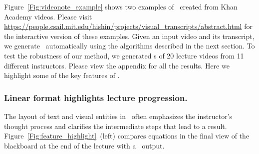 Figure~\ref{Fig:videonote_example} shows two examples of \systemname\ created from Khan Academy videos. Please visit \url{https://people.csail.mit.edu/hishin/projects/visual_transcripts/abstract.html} for the interactive version of these examples. Given an input video and its transcript, we generate \systemname\ automatically using the algorithms described in the next section. To test the robustness of our method, we generated \systemname s of 20 lecture videos from 11 different instructors. Please view the appendix for all the results. Here we highlight some of the key features of \systemname .\\
%

\subsubsection{Linear format highlights lecture progression.} 
The layout of text and visual entities in \systemname\ often emphasizes the instructor's thought process and clarifies the intermediate steps that lead to a result. Figure~\ref{Fig:feature_highlight}~(left) compares equations in the final view of the blackboard at the end of the lecture with a \systemname\ output. 
%
